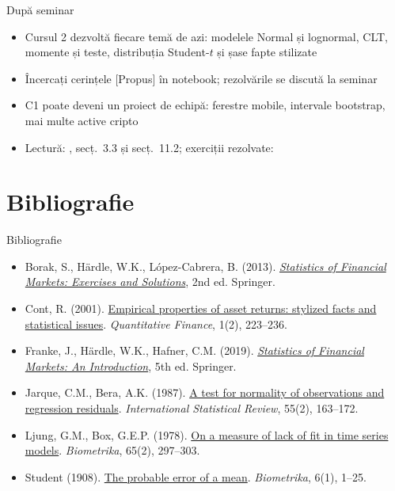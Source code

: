 \begin{frame}{După seminar}
\itemsize{\small}
\begin{itemize}
    \item Cursul 2 dezvoltă fiecare temă de azi: modelele Normal și lognormal, CLT, momente și teste, distribuția Student-$t$ și șase fapte stilizate
    \item Încercați cerințele [Propus] în notebook; rezolvările se discută la seminar
    \item C1 poate deveni un proiect de echipă: ferestre mobile, intervale bootstrap, mai multe active cripto
    \item Lectură: , secț.~3.3 și secț.~11.2; exerciții rezolvate: 
\end{itemize}
\end{frame}


\section{Bibliografie}

\begin{frame}{Bibliografie}
\itemsize{\tiny}
\begin{itemize}
    \item Borak, S., Härdle, W.K., López-Cabrera, B. (2013). \href{https://doi.org/10.1007/978-3-642-33929-5}{\textit{Statistics of Financial Markets: Exercises and Solutions}}, 2nd ed. Springer.
    \item Cont, R. (2001). \href{https://doi.org/10.1080/713665670}{Empirical properties of asset returns: stylized facts and statistical issues}. \textit{Quantitative Finance}, 1(2), 223--236.
    \item Franke, J., Härdle, W.K., Hafner, C.M. (2019). \href{https://doi.org/10.1007/978-3-030-13751-9}{\textit{Statistics of Financial Markets: An Introduction}}, 5th ed. Springer.
    \item Jarque, C.M., Bera, A.K. (1987). \href{https://doi.org/10.2307/1403192}{A test for normality of observations and regression residuals}. \textit{International Statistical Review}, 55(2), 163--172.
    \item Ljung, G.M., Box, G.E.P. (1978). \href{https://doi.org/10.1093/biomet/65.2.297}{On a measure of lack of fit in time series models}. \textit{Biometrika}, 65(2), 297--303.
    \item Student (1908). \href{https://doi.org/10.1093/biomet/6.1.1}{The probable error of a mean}. \textit{Biometrika}, 6(1), 1--25.
\end{itemize}
\end{frame}


